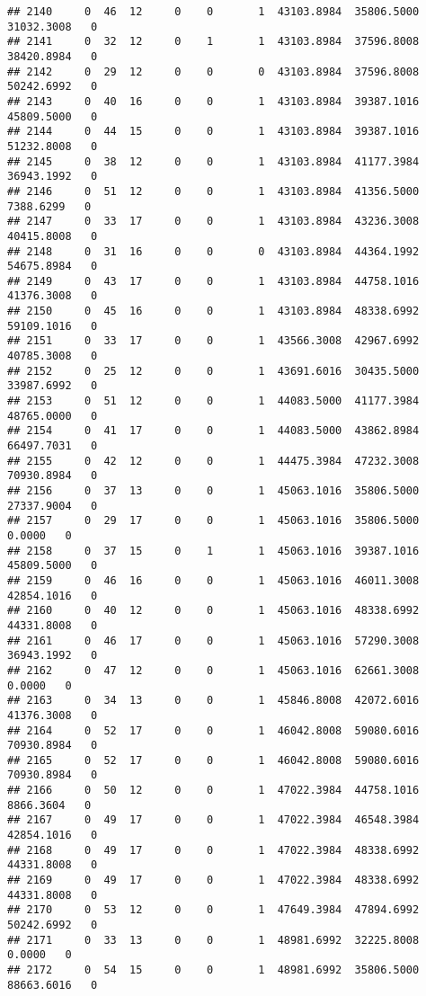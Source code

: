 \documentclass[
]{article}
\begin{document}
\begin{enumerate}
\begin{verbatim}
## 2140     0  46  12     0    0       1  43103.8984  35806.5000  31032.3008   0
## 2141     0  32  12     0    1       1  43103.8984  37596.8008  38420.8984   0
## 2142     0  29  12     0    0       0  43103.8984  37596.8008  50242.6992   0
## 2143     0  40  16     0    0       1  43103.8984  39387.1016  45809.5000   0
## 2144     0  44  15     0    0       1  43103.8984  39387.1016  51232.8008   0
## 2145     0  38  12     0    0       1  43103.8984  41177.3984  36943.1992   0
## 2146     0  51  12     0    0       1  43103.8984  41356.5000   7388.6299   0
## 2147     0  33  17     0    0       1  43103.8984  43236.3008  40415.8008   0
## 2148     0  31  16     0    0       0  43103.8984  44364.1992  54675.8984   0
## 2149     0  43  17     0    0       1  43103.8984  44758.1016  41376.3008   0
## 2150     0  45  16     0    0       1  43103.8984  48338.6992  59109.1016   0
## 2151     0  33  17     0    0       1  43566.3008  42967.6992  40785.3008   0
## 2152     0  25  12     0    0       1  43691.6016  30435.5000  33987.6992   0
## 2153     0  51  12     0    0       1  44083.5000  41177.3984  48765.0000   0
## 2154     0  41  17     0    0       1  44083.5000  43862.8984  66497.7031   0
## 2155     0  42  12     0    0       1  44475.3984  47232.3008  70930.8984   0
## 2156     0  37  13     0    0       1  45063.1016  35806.5000  27337.9004   0
## 2157     0  29  17     0    0       1  45063.1016  35806.5000      0.0000   0
## 2158     0  37  15     0    1       1  45063.1016  39387.1016  45809.5000   0
## 2159     0  46  16     0    0       1  45063.1016  46011.3008  42854.1016   0
## 2160     0  40  12     0    0       1  45063.1016  48338.6992  44331.8008   0
## 2161     0  46  17     0    0       1  45063.1016  57290.3008  36943.1992   0
## 2162     0  47  12     0    0       1  45063.1016  62661.3008      0.0000   0
## 2163     0  34  13     0    0       1  45846.8008  42072.6016  41376.3008   0
## 2164     0  52  17     0    0       1  46042.8008  59080.6016  70930.8984   0
## 2165     0  52  17     0    0       1  46042.8008  59080.6016  70930.8984   0
## 2166     0  50  12     0    0       1  47022.3984  44758.1016   8866.3604   0
## 2167     0  49  17     0    0       1  47022.3984  46548.3984  42854.1016   0
## 2168     0  49  17     0    0       1  47022.3984  48338.6992  44331.8008   0
## 2169     0  49  17     0    0       1  47022.3984  48338.6992  44331.8008   0
## 2170     0  53  12     0    0       1  47649.3984  47894.6992  50242.6992   0
## 2171     0  33  13     0    0       1  48981.6992  32225.8008      0.0000   0
## 2172     0  54  15     0    0       1  48981.6992  35806.5000  88663.6016   0

\end{verbatim}
\end{enumerate}
\end{document}
